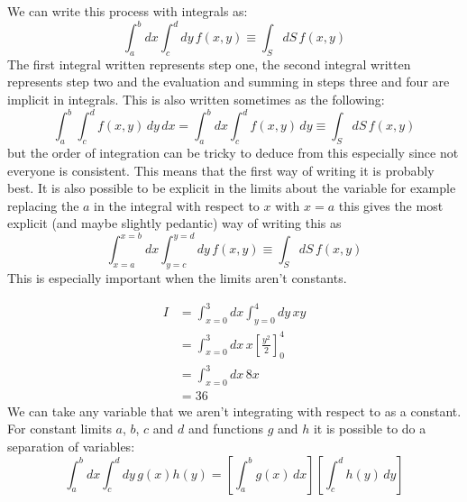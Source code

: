 \documentclass{article}
\begin{document}
    We can write this process with integrals as:
    \[\int_a^b dx\int_c^d dy\, f(x, y) \equiv \int_S dS\, f(x, y)\]
    The first integral written represents step one, the second integral written represents step two and the evaluation and summing in steps three and four are implicit in integrals.
    This is also written sometimes as the following:
    \[\int_a^b \int_c^d f(x, y) \,dy\,dx = \int_a^b dx\int_c^d f(x, y)\, dy\equiv \int_S dS\, f(x, y)\]
    but the order of integration can be tricky to deduce from this especially since not everyone is consistent.
    This means that the first way of writing it is probably best.
    It is also possible to be explicit in the limits about the variable for example replacing the \(a\) in the integral with respect to \(x\) with \(x = a\) this gives the most explicit (and maybe slightly pedantic) way of writing this as
    \[\int_{x = a}^{x = b} dx\int_{y = c}^{y = d} dy\, f(x, y) \equiv \int_S dS\, f(x, y)\]
    This is especially important when the limits aren't constants.
    
    \example
    \begin{align*}
        I &= \int_{x = 0}^3 dx\int_{y = 0}^4 dy\, xy\\
        &= \int_{x = 0}^3 dx\,x\left[\frac{y^2}{2}\right]_0^4\\
        &= \int_{x = 0}^3 dx\,8x\\
        &= 36
    \end{align*}
    We can take any variable that we aren't integrating with respect to as a constant.
    For constant limits \(a\), \(b\), \(c\) and \(d\) and functions \(g\) and \(h\) it is possible to do a separation of variables:
    \[\int_a^b dx\int_c^d dy\, g(x)h(y) = \left[\int_a^b g(x)\, dx\right]\left[\int_c^d h(y)\, dy\right]\]
    
\end{document}
